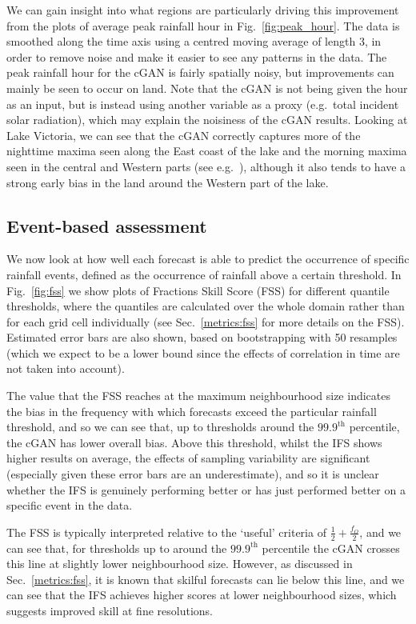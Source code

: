 \documentclass{article}
\begin{document}
We can gain insight into what regions are particularly driving this improvement from the plots of average peak rainfall hour in Fig.~\ref{fig:peak_hour}. The data is smoothed along the time axis using a centred moving average of length 3, in order to remove noise and make it easier to see any patterns in the data. The peak rainfall hour for the cGAN is fairly spatially noisy, but improvements can mainly be seen to occur on land. Note that the cGAN is not being given the hour as an input, but is instead using another variable as a proxy (e.g.~total incident solar radiation), which may explain the noisiness of the cGAN results. Looking at Lake Victoria, we can see that the cGAN correctly captures more of the nighttime maxima seen along the East coast of the lake and the morning maxima seen in the central and Western parts (see e.g.~\cite{woodhams_identifying_2019}), although it also tends to have a strong early bias in the land around the Western part of the lake.


\subsection{Event-based assessment}


We now look at how well each forecast is able to predict the occurrence of specific rainfall events, defined as the occurrence of rainfall above a certain threshold. In Fig.~\ref{fig:fss} we show plots of Fractions Skill Score (FSS) for different quantile thresholds, where the quantiles are calculated over the whole domain rather than for each grid cell individually (see Sec.~\ref{metrics:fss} for more details on the FSS). Estimated error bars are also shown, based on bootstrapping with 50 resamples (which we expect to be a lower bound since the effects of correlation in time are not taken into account). 

The value that the FSS reaches at the maximum neighbourhood size indicates the bias in the frequency with which forecasts exceed the particular rainfall threshold, and so we can see that, up to thresholds around the $99.9^{\text{th}}$ percentile, the cGAN has lower overall bias. Above this threshold, whilst the IFS shows higher results on average, the effects of sampling variability are significant (especially given these error bars are an underestimate), and so it is unclear whether the IFS is genuinely performing better or has just performed better on a specific event in the data. 

The FSS is typically interpreted relative to the `useful' criteria of $\frac{1}{2} + \frac{f_O}{2}$, and we can see that, for thresholds up to around the $99.9^{\text{th}}$ percentile the cGAN crosses this line at slightly lower neighbourhood size. However, as discussed in Sec.~\ref{metrics:fss}, it is known that skilful forecasts can lie below this line, and we can see that the IFS achieves higher scores at lower neighbourhood sizes, which suggests improved skill at fine resolutions. 
\end{document}
